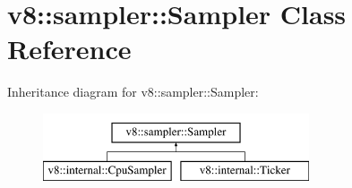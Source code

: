 \hypertarget{classv8_1_1sampler_1_1Sampler}{}\section{v8\+:\+:sampler\+:\+:Sampler Class Reference}
\label{classv8_1_1sampler_1_1Sampler}
Inheritance diagram for v8\+:\+:sampler\+:\+:Sampler\+:\begin{figure}[H]
\begin{center}
\leavevmode
\includegraphics[height=2.000000cm]{classv8_1_1sampler_1_1Sampler}
\end{center}
\end{figure}
